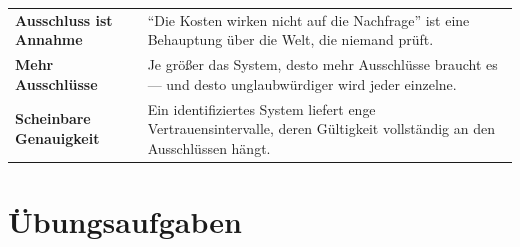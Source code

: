 \begin{warnung}
\begin{center}
{\small
\renewcommand{\arraystretch}{1.52}
\begin{tabular}{@{}P{2.8cm}P{5.8cm}@{}}
\toprule
\textbf{Ausschluss ist Annahme} & \enquote{Die Kosten wirken nicht auf die Nachfrage} ist eine Behauptung über die Welt, die niemand prüft.\\
\textbf{Mehr Ausschlüsse} & Je größer das System, desto mehr Ausschlüsse braucht es --- und desto unglaubwürdiger wird jeder einzelne.\\
\textbf{Scheinbare Genauigkeit} & Ein identifiziertes System liefert enge Vertrauensintervalle, deren Gültigkeit vollständig an den Ausschlüssen hängt.\\
\bottomrule
\end{tabular}}
\end{center}

\begin{center}
\begin{minipage}{0.88\textwidth}
\end{minipage}
\end{center}
\end{warnung}

\section{Übungsaufgaben}

